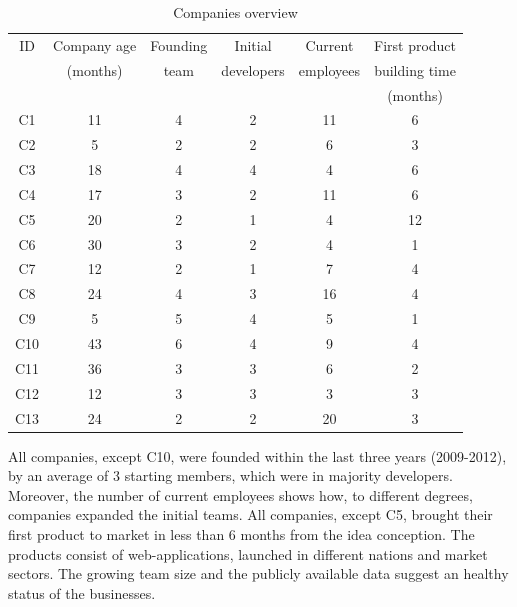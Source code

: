 \documentclass[10pt,journal,letterpaper,compsoc]{IEEEtran}
\begin{document}
\begin{table}[!t]
\renewcommand{\arraystretch}{1.3}
\caption{Companies overview} 
\label{t_interviews-stats}
\centering
\begin{tabular}{|c||c||c||c||c||c|}

\hline
    ID  &  Company age & Founding & Initial & Current & First product  \\
    &   (months)   & team   & developers  & employees  &  building time \\
                    &      & &   &  & (months)   \\
   \hline
C1    & 11    & 4     & 2     & 11    & 6   \\
C2    & 5     & 2     & 2     & 6     & 3      \\
C3    & 18    & 4     & 4     & 4     & 6      \\
C4    & 17    & 3     & 2     & 11    & 6     \\
C5    & 20    & 2     & 1     & 4     & 12   \\
C6    & 30    & 3     & 2     & 4     & 1      \\
C7    & 12    & 2     & 1     & 7     & 4      \\
C8    & 24    & 4     & 3     & 16    & 4    \\
C9    & 5     & 5     & 4     & 5     & 1     \\
C10   & 43    & 6     & 4     & 9     & 4      \\
C11   & 36    & 3     & 3     & 6     & 2     \\
C12   & 12    & 3     & 3     & 3     & 3      \\
C13   & 24    & 2     & 2     & 20    & 3     \\
 
\hline
\end{tabular}
\end{table}

All companies, except C10, were founded within the last three years (2009-2012), 
by an average of 3 starting members, which were in majority developers. 
Moreover, the number of current employees shows how, to different degrees, 
companies expanded the initial teams. All companies, except C5, brought their 
first product to market in less than 6 months from the idea conception. The 
products consist of web-applications, launched in different nations and market 
sectors. The growing team size and the publicly available data suggest an 
healthy status of the businesses.
\end{document}
